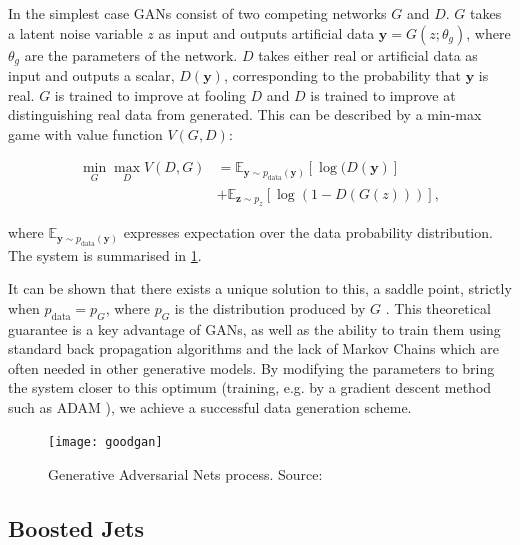 \documentclass[twocolumn,twoside]{article}
\begin{document}

In the simplest case GANs consist of two competing networks $G$ and $D$. $G$ takes a latent noise variable $z$ as input and outputs artificial data $\mathbf{y} = G(z;\theta_g)$, where $\theta_g$ are the parameters of the network. $D$ takes either real or artificial data as input and outputs a scalar, $D(\mathbf{y})$, corresponding to the probability that $\mathbf{y}$ is real. $G$ is trained to improve at fooling $D$ and $D$ is trained to improve at distinguishing real data from generated. This can be described by a min-max game with value function $V(G,D)$:

\begin{equation}
	\label{eq:minmax}
	\begin{split}
	\min_{G}\max_{D}V(D,G) &= \mathbb{E}_{\mathbf{y}\sim p_{\text{data}}(\mathbf{y})} [\log(D(\mathbf{y})]\\
	&  +\mathbb{E}_{\mathbf{z}\sim p_{z}} [\log(1-D(G(z)))],
	\end{split}
\end{equation} 

where  $\mathbb{E}_{\mathbf{y}\sim p_{\text{data}}(\mathbf{y})}$ expresses expectation over the data probability distribution. The system is summarised in \cref{fig:gandiag}.

It can be shown that there exists a unique solution to this, a saddle point, strictly when $p_{\text{data}} = p_G$, where $p_G$ is the distribution produced by $G$ \cite{gan1}. This theoretical guarantee is a key advantage of GANs, as well as the ability to train them using standard back propagation algorithms and the lack of Markov Chains which are often needed in other generative models. By modifying the parameters to bring the system closer to this optimum (training, e.g. by a gradient descent method such as ADAM \cite{adam}), we achieve a successful data generation scheme.   

\begin{figure}[H]
	\centering
	\texttt{[image: goodgan]}
	
	\caption{Generative Adversarial Nets process. Source: \cite{GoodfellowNips}}
	\label{fig:gandiag}
	
\end{figure}
 

\subsection{Boosted Jets}
\end{document}
